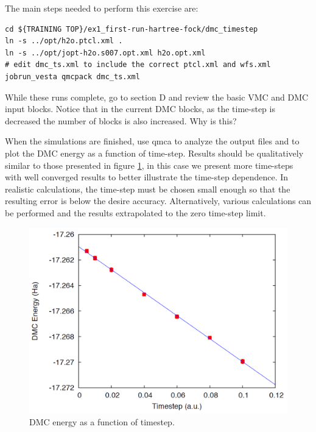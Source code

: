 The main steps needed to perform this exercise are:
\begin{shaded}
\begin{verbatim}
cd ${TRAINING TOP}/ex1_first-run-hartree-fock/dmc_timestep
ln -s ../opt/h2o.ptcl.xml .
ln -s ../opt/jopt-h2o.s007.opt.xml h2o.opt.xml
# edit dmc_ts.xml to include the correct ptcl.xml and wfs.xml
jobrun_vesta qmcpack dmc_ts.xml
\end{verbatim}
\end{shaded}
While these runs complete, go to section D and review the basic VMC and DMC input
blocks. Notice that in the current DMC blocks, as the time-step is decreased the number of blocks is also increased. Why is this?

When the simulations are finished, use qmca to analyze the output files and to plot the
DMC energy as a function of time-step. Results should be qualitatively similar to those
presented in figure \ref{fig:lam_dmc_timestep}, in this case we present more time-steps with well converged results to
better illustrate the time-step dependence. In realistic calculations, the time-step must be
chosen small enough so that the resulting error is below the desire accuracy. Alternatively,
various calculations can be performed and the results extrapolated to the zero time-step
limit.


\begin{figure}
\begin{center}
\includegraphics[trim = 0mm 0mm 0mm 0mm, clip,width=0.75\columnwidth]{./figures/lab_advanced_molecules_dmc_timestep}
\end{center}
\caption{DMC energy as a function of timestep.
\label{fig:lam_dmc_timestep}
}
\end{figure}


